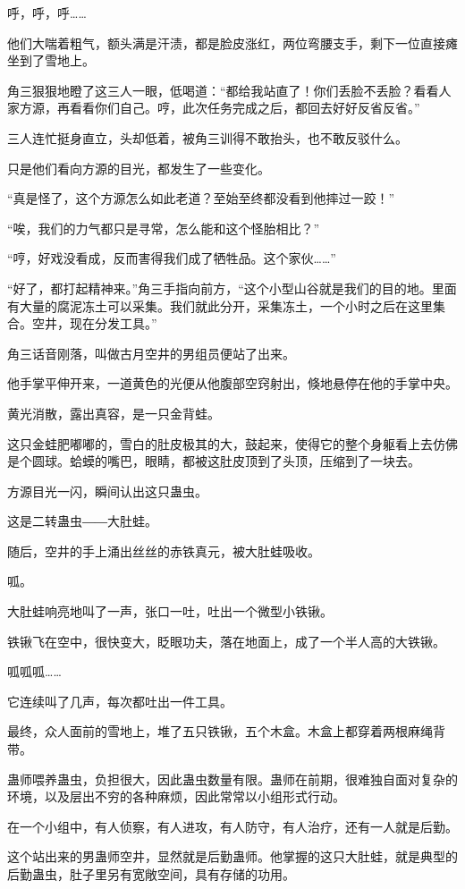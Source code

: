 \begin{this_body}
呼，呼，呼……

他们大喘着粗气，额头满是汗渍，都是脸皮涨红，两位弯腰支手，剩下一位直接瘫坐到了雪地上。

角三狠狠地瞪了这三人一眼，低喝道：“都给我站直了！你们丢脸不丢脸？看看人家方源，再看看你们自己。哼，此次任务完成之后，都回去好好反省反省。”

三人连忙挺身直立，头却低着，被角三训得不敢抬头，也不敢反驳什么。

只是他们看向方源的目光，都发生了一些变化。

“真是怪了，这个方源怎么如此老道？至始至终都没看到他摔过一跤！”

“唉，我们的力气都只是寻常，怎么能和这个怪胎相比？”

“哼，好戏没看成，反而害得我们成了牺牲品。这个家伙……”

“好了，都打起精神来。”角三手指向前方，“这个小型山谷就是我们的目的地。里面有大量的腐泥冻土可以采集。我们就此分开，采集冻土，一个小时之后在这里集合。空井，现在分发工具。”

角三话音刚落，叫做古月空井的男组员便站了出来。

他手掌平伸开来，一道黄色的光便从他腹部空窍射出，倏地悬停在他的手掌中央。

黄光消散，露出真容，是一只金背蛙。

这只金蛙肥嘟嘟的，雪白的肚皮极其的大，鼓起来，使得它的整个身躯看上去仿佛是个圆球。蛤蟆的嘴巴，眼睛，都被这肚皮顶到了头顶，压缩到了一块去。

方源目光一闪，瞬间认出这只蛊虫。

这是二转蛊虫――大肚蛙。

随后，空井的手上涌出丝丝的赤铁真元，被大肚蛙吸收。

呱。

大肚蛙响亮地叫了一声，张口一吐，吐出一个微型小铁锹。

铁锹飞在空中，很快变大，眨眼功夫，落在地面上，成了一个半人高的大铁锹。

呱呱呱……

它连续叫了几声，每次都吐出一件工具。

最终，众人面前的雪地上，堆了五只铁锹，五个木盒。木盒上都穿着两根麻绳背带。

蛊师喂养蛊虫，负担很大，因此蛊虫数量有限。蛊师在前期，很难独自面对复杂的环境，以及层出不穷的各种麻烦，因此常常以小组形式行动。

在一个小组中，有人侦察，有人进攻，有人防守，有人治疗，还有一人就是后勤。

这个站出来的男蛊师空井，显然就是后勤蛊师。他掌握的这只大肚蛙，就是典型的后勤蛊虫，肚子里另有宽敞空间，具有存储的功用。


\end{this_body}

